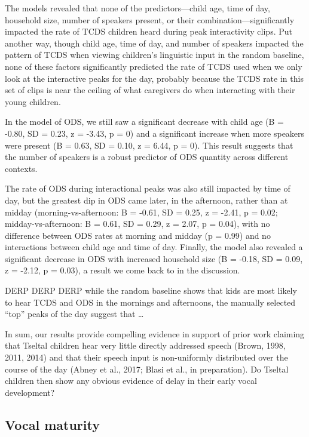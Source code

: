 \documentclass[floatsintext,man]{apa6}
\theoremstyle{definition}
\theoremstyle{definition}
\theoremstyle{definition}
\theoremstyle{remark}
\begin{document}
The models revealed that none of the predictors---child age, time of
day, household size, number of speakers present, or their
combination---significantly impacted the rate of TCDS children heard
during peak interactivity clips. Put another way, though child age, time
of day, and number of speakers impacted the pattern of TCDS when viewing
children's linguistic input in the random baseline, none of these
factors significantly predicted the rate of TCDS used when we only look
at the interactive peaks for the day, probably because the TCDS rate in
this set of clips is near the ceiling of what caregivers do when
interacting with their young children.

In the model of ODS, we still saw a significant decrease with child age
(B = -0.80, SD = 0.23, z = -3.43, p = 0) and a significant increase when
more speakers were present (B = 0.63, SD = 0.10, z = 6.44, p = 0). This
result suggests that the number of speakers is a robust predictor of ODS
quantity across different contexts.

The rate of ODS during interactional peaks was also still impacted by
time of day, but the greatest dip in ODS came later, in the afternoon,
rather than at midday (morning-vs-afternoon: B = -0.61, SD = 0.25, z =
-2.41, p = 0.02; midday-vs-afternoon: B = 0.61, SD = 0.29, z = 2.07, p =
0.04), with no difference between ODS rates at morning and midday (p =
0.99) and no interactions between child age and time of day. Finally,
the model also revealed a significant decrease in ODS with increased
household size (B = -0.18, SD = 0.09, z = -2.12, p = 0.03), a result we
come back to in the discussion.

DERP DERP DERP while the random baseline shows that kids are most likely
to hear TCDS and ODS in the mornings and afternoons, the manually
selected \enquote{top} peaks of the day suggest that \ldots{}

In sum, our results provide compelling evidence in support of prior work
claiming that Tseltal children hear very little directly addressed
speech (Brown, 1998, 2011, 2014) and that their speech input is
non-uniformly distributed over the course of the day (Abney et al.,
2017; Blasi et al., in preparation). Do Tseltal children then show any
obvious evidence of delay in their early vocal development?

\subsection{Vocal maturity}\label{vocal-maturity}
\end{document}
